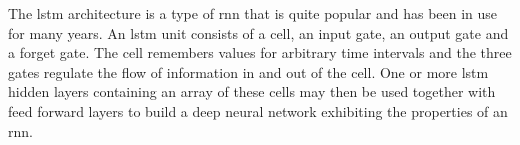 The \acrfull{lstm} architecture is a type of \acrshort{rnn} that is quite popular and has been in use for many years. An \acrshort{lstm} unit consists of a cell, an input gate, an output gate and a forget gate. The cell remembers values for arbitrary time intervals and the three gates regulate the flow of information in and out of the cell\cite{hochreiter1997long}. One or more \acrshort{lstm} hidden layers containing an array of these cells may then be used together with feed forward layers to build a deep neural network exhibiting the properties of an \acrshort{rnn}.




